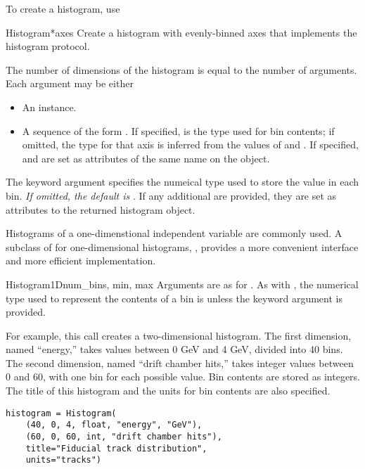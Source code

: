 To create a histogram, use

\begin{funcdesc}{Histogram}{*axes}
 Create a histogram with evenly-binned axes that implements the
 histogram protocol.  

 The number of dimensions of the histogram is equal to the number of
  arguments.  Each argument may be either
 \begin{itemize}
  \item An  instance.

  \item A sequence of the form .  If specified,  is the type
  used for bin contents; if omitted, the type for that axis is inferred
  from the values of  and .  If specified, 
  and  are set as attributes of the same name on the
   object.
 \end{itemize}

 The keyword argument  specifies the numeical type used to
 store the value in each bin.  \emph{If omitted, the default is
 }.  If any additional  are provided, they are
 set as attributes to the returned histogram object.
\end{funcdesc}

Histograms of a one-dimenstional independent variable are commonly
used.  A subclass of  for one-dimensional histograms,
, provides a more convenient interface and more
efficient implementation.

\begin{funcdesc}{Histogram1D}{num_bins, min, max} 
 Arguments are as for .  As with
 , the numerical type used to represent the contents
 of a bin is  unless the  keyword argument is
 provided.
\end{funcdesc}

For example, this call creates a two-dimensional histogram.  The first
dimension, named ``energy,'' takes  values between 0 GeV and
4 GeV, divided into 40 bins.  The second dimension, named ``drift
chamber hits,'' takes integer values between 0 and 60, with one bin for
each possible value.  Bin contents are stored as integers.  The title of
this histogram and the units for bin contents are also specified.
\begin{verbatim}
histogram = Histogram(
    (40, 0, 4, float, "energy", "GeV"),
    (60, 0, 60, int, "drift chamber hits"),
    title="Fiducial track distribution",
    units="tracks")
\end{verbatim}

